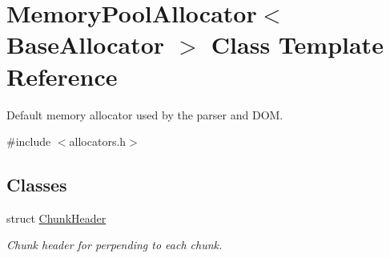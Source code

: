 \hypertarget{class_memory_pool_allocator}{}\section{Memory\+Pool\+Allocator$<$ Base\+Allocator $>$ Class Template Reference}
\label{class_memory_pool_allocator}


Default memory allocator used by the parser and D\+OM.  




{\ttfamily \#include $<$allocators.\+h$>$}

\subsection*{Classes}
\begin{DoxyCompactItemize}
\item 
struct \hyperlink{struct_memory_pool_allocator_1_1_chunk_header}{Chunk\+Header}
\begin{DoxyCompactList}\small\item\em Chunk header for perpending to each chunk. \end{DoxyCompactList}\end{DoxyCompactItemize}
